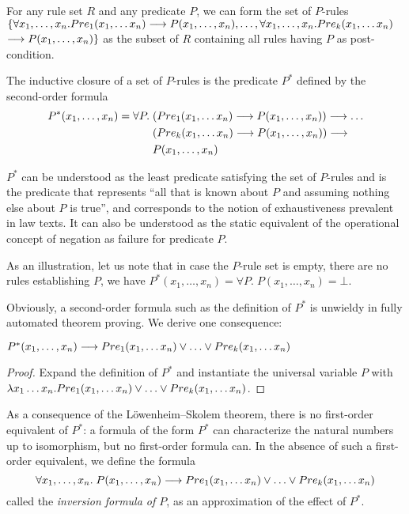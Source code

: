 For any rule set $R$ and any predicate $P$, we can form the set of $P$-rules
$\{\forall x_1, \dots, x_n. Pre_1(x_1, \dots x_n) \longrightarrow P(x_1, \dots, x_n),
\dots, \forall x_1, \dots, x_n. Pre_k(x_1, \dots x_n)$ $\longrightarrow P(x_1, \dots,
x_n)\}$ as the subset of $R$ containing all rules having $P$ as
post-condition. 

The inductive closure of a set of $P$-rules is the predicate $P^*$ defined by
the second-order formula
\begin{align*}
  P^*(x_1, \dots, x_n) = \forall P.\;  & (Pre_1(x_1, \dots x_n) \longrightarrow P(x_1, \dots, x_n)) \longrightarrow \dots \\
                         & (Pre_k(x_1, \dots x_n) \longrightarrow P(x_1, \dots, x_n)) \longrightarrow\\
                         & P(x_1, \dots, x_n)
\end{align*}

$P^*$ can be understood as the least predicate satisfying the set of $P$-rules
and is the predicate that represents ``all that is known about $P$ and
assuming nothing else about $P$ is true'', and corresponds to the notion of
exhaustiveness prevalent in law texts. It can also be understood as the static
equivalent of the operational concept of negation as failure for predicate $P$.

As an illustration, let us note that in case the $P$-rule set is empty, \ie there
are no rules establishing $P$, we have $P^*(x_1, \dots, x_n) = \forall
P.\;  P(x_1, \dots, x_n) = \bot$.

Obviously, a second-order formula such as the definition of $P^*$ is unwieldy
in fully automated theorem proving. We derive one consequence:

\begin{lemma}
$P^*(x_1, \dots, x_n) \IMPL Pre_1(x_1, \dots x_n) \OR \dots \OR Pre_k(x_1, \dots x_n)$
\end{lemma}
\begin{proof}
Expand the definition of $P^*$ and instantiate the universal variable $P$ with
$\lambda x_1 \dots x_n. Pre_1(x_1, \dots x_n) \OR \dots \OR Pre_k(x_1, \dots x_n)$.
\end{proof}
As a consequence of the Löwenheim–Skolem theorem, there is no first-order
equivalent of $P^*$: a formula of the form $P^*$ can characterize the natural
numbers up to isomorphism, but no first-order formula can. In the absence of
such a first-order equivalent, we define the formula
\[
\forall x_1, \dots, x_n.\;  P(x_1, \dots, x_n) \IMPL Pre_1(x_1, \dots x_n) \OR \dots \OR Pre_k(x_1, \dots x_n)
\]
called the \emph{inversion formula of  $P$}, as an approximation of the
effect of $P^*$.

